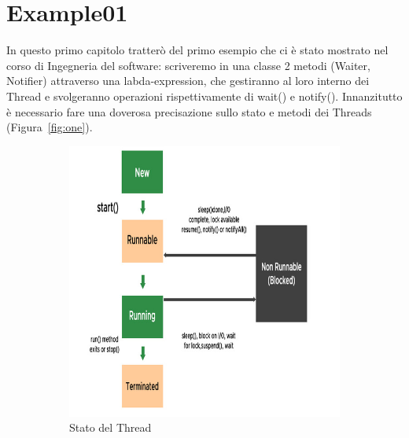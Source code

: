 \setlength{\headheight}{14.49998pt}

\chapter{Example01}\label{chapter:Capitolo1}
In questo primo capitolo tratterò del primo esempio che ci è stato mostrato nel corso di Ingegneria del software: scriveremo in una classe 2 metodi (Waiter, Notifier) attraverso una labda-expression, che gestiranno al loro interno dei Thread e svolgeranno operazioni rispettivamente di wait() e notify().
%
\newline
\newline
%
Innanzitutto è necessario fare una doverosa precisazione sullo stato e metodi dei Threads (Figura~\ref{fig:one}).
\begin{figure}[ht]
	\centering
	\begin{subfigure}{0.5\textwidth}
		\includegraphics[width=1.0\textwidth]{Immagini/image_thread1.jpg}
		\caption{Stato del Thread}
	\end{subfigure}%
	\begin{subfigure}{0.5\textwidth}

\end{subfigure}
\end{figure}

